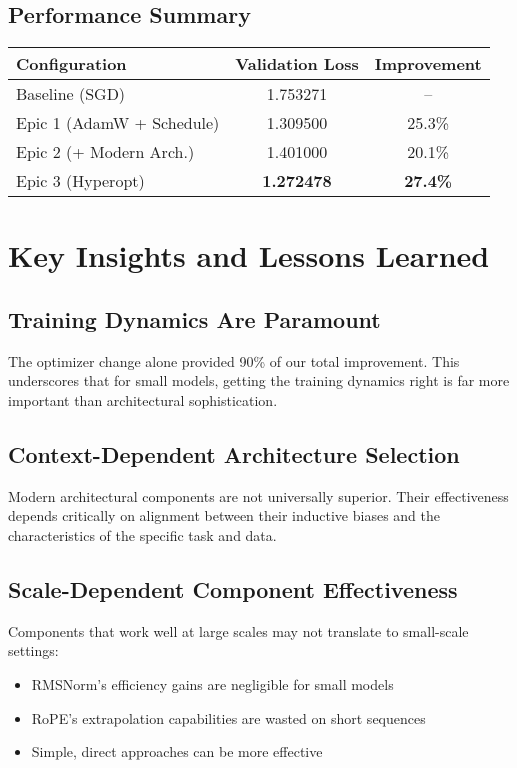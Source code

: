 \documentclass[11pt,a4paper]{article}
\begin{document}
\subsection{Performance Summary}
\begin{center}
\begin{tabular}{lcc}
\toprule
Configuration & Validation Loss & Improvement \\
\midrule
Baseline (SGD) & 1.753271 & -- \\
Epic 1 (AdamW + Schedule) & 1.309500 & 25.3\% \\
Epic 2 (+ Modern Arch.) & 1.401000 & 20.1\% \\
Epic 3 (Hyperopt) & \textbf{1.272478} & \textbf{27.4\%} \\
\bottomrule
\end{tabular}
\end{center}

\section{Key Insights and Lessons Learned}

\subsection{Training Dynamics Are Paramount}
The optimizer change alone provided 90\% of our total improvement. This underscores that for small models, getting the training dynamics right is far more important than architectural sophistication.

\subsection{Context-Dependent Architecture Selection}
Modern architectural components are not universally superior. Their effectiveness depends critically on alignment between their inductive biases and the characteristics of the specific task and data.

\subsection{Scale-Dependent Component Effectiveness}
Components that work well at large scales may not translate to small-scale settings:
\begin{itemize}
    \item RMSNorm's efficiency gains are negligible for small models
    \item RoPE's extrapolation capabilities are wasted on short sequences
    \item Simple, direct approaches can be more effective
\end{itemize}
\end{document}
